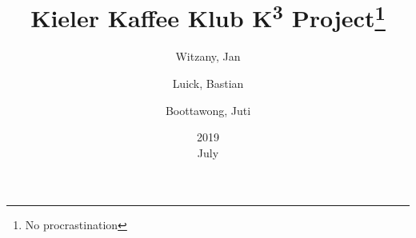 \documentclass{article}
\title{Kieler Kaffee Klub K\textsuperscript{3} Project\thanks{No procrastination}}
\date{2019\\ July}
\author{
  Witzany, Jan\\
  \and
  Luick, Bastian\\
  \and
  Boottawong, Juti\\
}
\begin{document}
\begin{titlepage}
\maketitle

\end{titlepage}
\tableofcontents						%

\vspace{2cm} %
 
























  
\end{document}
